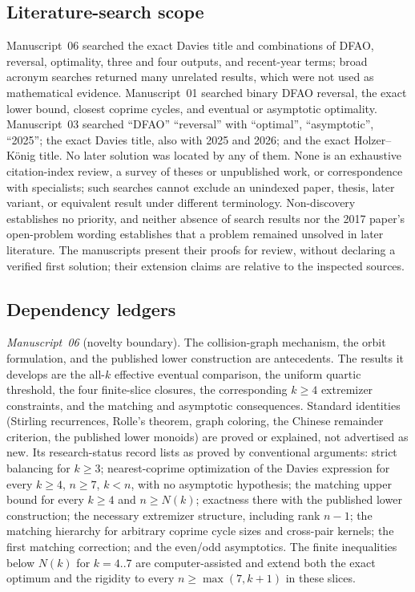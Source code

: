 \documentclass[11pt,a4paper]{article}
\numberwithin{equation}{section}
\theoremstyle{definition}
\theoremstyle{remark}
\begin{document}
\subsection{Literature-search scope}

Manuscript~06 searched the exact Davies title and combinations of DFAO,
reversal, optimality, three and four outputs, and recent-year terms; broad
acronym searches returned many unrelated results, which were not used as
mathematical evidence. Manuscript~01 searched binary DFAO reversal, the exact
lower bound, closest coprime cycles, and eventual or asymptotic optimality.
Manuscript~03 searched ``DFAO'' ``reversal'' with ``optimal'',
``asymptotic'', ``2025''; the exact Davies title, also with 2025 and 2026; and
the exact Holzer--K\"onig title. No later solution was located by any of
them. None is an exhaustive citation-index review, a survey of theses or
unpublished work, or correspondence with specialists; such searches cannot
exclude an unindexed paper, thesis, later variant, or equivalent result under
different terminology. Non-discovery establishes no priority, and neither
absence of search results nor the 2017 paper's open-problem wording
establishes that a problem remained unsolved in later literature. The
manuscripts present their proofs for review, without declaring a verified
first solution; their extension claims are relative to the inspected sources.

\subsection{Dependency ledgers}

\emph{Manuscript~06} (novelty boundary). The collision-graph mechanism, the
orbit formulation, and the published lower construction are antecedents. The
results it develops are the all-$k$ effective eventual comparison, the uniform
quartic threshold, the four finite-slice closures, the corresponding $k\ge4$
extremizer constraints, and the matching and asymptotic consequences.
Standard identities (Stirling recurrences, Rolle's theorem, graph coloring,
the Chinese remainder criterion, the published lower monoids) are proved or
explained, not advertised as new. Its research-status record lists as proved
by conventional arguments: strict balancing for $k\ge3$; nearest-coprime
optimization of the Davies expression for every $k\ge4$, $n\ge7$, $k<n$, with
no asymptotic hypothesis; the matching upper bound for every $k\ge4$ and
$n\ge N(k)$; exactness there with the published lower construction; the
necessary extremizer structure, including rank $n-1$; the matching hierarchy
for arbitrary coprime cycle sizes and cross-pair kernels; the first matching
correction; and the even/odd asymptotics. The finite inequalities below $N(k)$
for $k=4..7$ are computer-assisted and extend both the exact optimum and the
rigidity to every $n\ge\max(7,k+1)$ in these slices.
\end{document}
